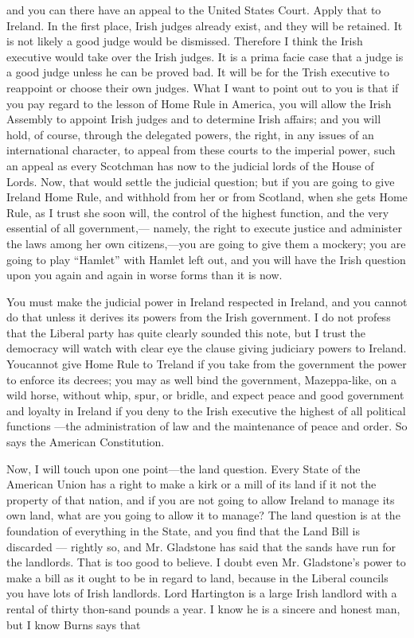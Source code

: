 \documentclass[11pt,openany]{book}
\begin{document}
and you can there have an appeal to the United States Court. Apply that to Ireland. In the first place, Irish judges already exist, and they will be retained. It is not likely a good judge would be dismissed. Therefore I think the Irish executive would take over the Irish judges. It is a prima facie case that a judge is a good judge unless he can be proved bad. It will be for the Trish executive to reappoint or choose their own judges. What I want to point out to you is that if you pay regard to the lesson of Home Rule in America, you will allow the Irish Assembly to appoint Irish judges and to determine Irish affairs; and you will hold, of course, through the delegated powers, the right, in any issues of an international character, to appeal from these courts to the imperial power, such an appeal as every Scotchman has now to the judicial lords of the House of Lords. Now, that would settle the judicial question; but if you are going to give Ireland Home Rule, and withhold from her or from Scotland, when she gets Home Rule, as I trust she soon will, the control of the highest function, and the very essential of all government,--- namely, the right to execute justice and administer the laws among her own citizens,---you are going to give them a mockery; you are going to play ``Hamlet'' with Hamlet left out, and you will have the Irish question upon you again and again in worse forms than it is now.

You must make the judicial power in Ireland respected in Ireland, and you cannot do that unless it derives its powers from the Irish government. I do not profess that the Liberal party has quite clearly sounded this note, but I trust the democracy will watch with clear eye the clause giving judiciary powers to Ireland. Youcannot give Home Rule to Treland if you take from the government the power to enforce its decrees; you may as well bind the government, Mazeppa-like, on a wild horse, without whip, spur, or bridle, and expect peace and good government and loyalty in Ireland if you deny to the Irish executive the highest of all political functions ---the administration of law and the maintenance of peace and order. So says the American Constitution.

Now, I will touch upon one point---the land question. Every State of the American Union has a right to make a kirk or a mill of its land if it not the property of that nation, and if you are not going to allow Ireland to manage its own land, what are you going to allow it to manage? The land question is at the foundation of everything in the State, and you find that the Land Bill is discarded --- rightly so, and Mr. Gladstone has said that the sands have run for the landlords. That is too good to believe. I doubt even Mr. Gladstone's power to make a bill as it ought to be in regard to land, because in the Liberal councils you have lots of Irish landlords. Lord Hartington is a large Irish landlord with a rental of thirty thon-sand pounds a year. I know he is a sincere and honest man, but I know Burns says that
\end{document}
